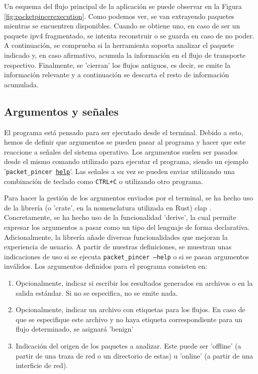 Un esquema del flujo principal de la aplicación se puede observar en la Figura \ref{fig:packetpincerexecution}. Como podemos ver, se van extrayendo paquetes mientras se encuentren disponibles. Cuando se obtiene uno, en caso de ser un paquete \acrshort{ipv4} fragmentado, se intenta reconstruir o se guarda en caso de no poder. A continuación, se comprueba si la herramienta soporta analizar el paquete indicado y, en caso afirmativo, acumula la información en el flujo de transporte respectivo. Finalmente, se 'cierran' los flujos antiguos, es decir, se emite la información relevante y a continuación se descarta el resto de información acumulada.

\subsection{Argumentos y señales}

El programa está pensado para ser ejecutado desde el terminal. Debido a esto, hemos de definir que argumentos se pueden pasar al programa y hacer que este reaccione a señales del sistema operativo. Los argumentos suelen ser pasados desde el mismo comando utilizado para ejecutar el programa, siendo un ejemplo '\texttt{packet\_pincer \underline{help}}'. Las señales a su vez se pueden enviar utilizando una combinación de teclado como \texttt{CTRL+C} o utilizando otro programa.

Para hacer la gestión de los argumentos enviados por el terminal, se ha hecho uso de la librería (o 'crate', en la nomenclatura utilizada en Rust) clap \cite{Knapp_clap_2024}. Concretamente, se ha hecho uso de la funcionalidad 'derive', la cual permite expresar los argumentos a pasar como un tipo del lenguaje de forma declarativa. Adicionalmente, la librería añade diversas funcionalidades que mejoran la experiencia de usuario. A partir de nuestras definiciones, se muestran unas indicaciones de uso si se ejecuta \texttt{packet\_pincer --help} o si se pasan argumentos inválidos. Los argumentos definidos para el programa consisten en:

\begin{enumerate}
  \item Opcionalmente, indicar si escribir los resultados generados en archivos o en la salida estándar. Si no se especifica, no se emite nada.
  \item Opcionalmente, indicar un archivo con etiquetas para los flujos. En caso de que se especifique este archivo y no haya etiqueta correspondiente para un flujo determinado, se asignará 'benign'
  \item Indicación del origen de los paquetes a analizar. Este puede ser 'offline' (a partir de una traza de red o un directorio de estas) u 'online' (a partir de una interficie de red).
\end{enumerate}

